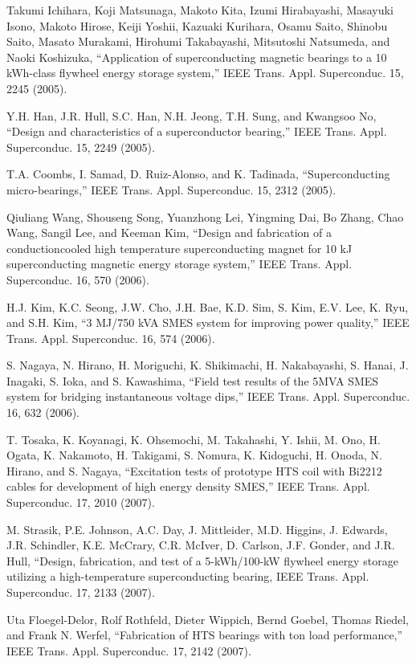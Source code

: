 \noindent [9.96] Takumi Ichihara, Koji Matsunaga, Makoto Kita, Izumi Hirabayashi, Masayuki
Isono, Makoto Hirose, Keiji Yoshii, Kazuaki Kurihara, Osamu Saito, Shinobu
Saito, Masato Murakami, Hirohumi Takabayashi, Mitsutoshi Natsumeda, and
Naoki Koshizuka, ``Application of superconducting magnetic bearings to a 10
kWh-class flywheel energy storage system,” IEEE Trans. Appl. Superconduc. 15,
2245 (2005).

\noindent [9.97] Y.H. Han, J.R. Hull, S.C. Han, N.H. Jeong, T.H. Sung, and Kwangsoo No, ``Design
and characteristics of a superconductor bearing,” IEEE Trans. Appl. Superconduc.
15, 2249 (2005).

\noindent [9.98] T.A. Coombs, I. Samad, D. Ruiz-Alonso, and K. Tadinada, ``Superconducting
micro-bearings,” IEEE Trans. Appl. Superconduc. 15, 2312 (2005).

\noindent [9.99] Qiuliang Wang, Shouseng Song, Yuanzhong Lei, Yingming Dai, Bo Zhang, Chao
Wang, Sangil Lee, and Keeman Kim, ``Design and fabrication of a conductioncooled
high temperature superconducting magnet for 10 kJ superconducting magnetic
energy storage system,” IEEE Trans. Appl. Superconduc. 16, 570 (2006).

\noindent [9.100] H.J. Kim, K.C. Seong, J.W. Cho, J.H. Bae, K.D. Sim, S. Kim, E.V. Lee, K. Ryu,
and S.H. Kim, ``3 MJ/750 kVA SMES system for improving power quality,” IEEE
Trans. Appl. Superconduc. 16, 574 (2006).

\noindent [9.101] S. Nagaya, N. Hirano, H. Moriguchi, K. Shikimachi, H. Nakabayashi, S. Hanai,
J. Inagaki, S. Ioka, and S. Kawashima, ``Field test results of the 5MVA SMES
system for bridging instantaneous voltage dips,” IEEE Trans. Appl. Superconduc.
16, 632 (2006).

\noindent [9.102] T. Tosaka, K. Koyanagi, K. Ohsemochi, M. Takahashi, Y. Ishii, M. Ono, H. Ogata,
K. Nakamoto, H. Takigami, S. Nomura, K. Kidoguchi, H. Onoda, N. Hirano,
and S. Nagaya, ``Excitation tests of prototype HTS coil with Bi2212 cables for
development of high energy density SMES,” IEEE Trans. Appl. Superconduc.
17, 2010 (2007).

\noindent [9.103] M. Strasik, P.E. Johnson, A.C. Day, J. Mittleider, M.D. Higgins, J. Edwards, J.R.
Schindler, K.E. McCrary, C.R. McIver, D. Carlson, J.F. Gonder, and J.R. Hull,
``Design, fabrication, and test of a 5-kWh/100-kW flywheel energy storage utilizing
a high-temperature superconducting bearing, IEEE Trans. Appl. Superconduc.
17, 2133 (2007).

\noindent [9.104] Uta Floegel-Delor, Rolf Rothfeld, Dieter Wippich, Bernd Goebel, Thomas Riedel,
and Frank N. Werfel, ``Fabrication of HTS bearings with ton load performance,”
IEEE Trans. Appl. Superconduc. 17, 2142 (2007).


